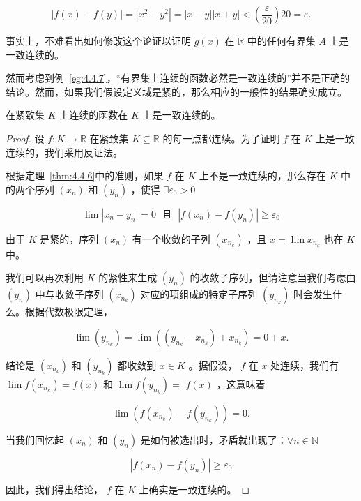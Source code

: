 \[
\left| {f\left( x\right)  - f\left( y\right) }\right|  = \left| {{x}^{2} - {y}^{2}}\right|  = \left| {x - y}\right| \left| {x + y}\right|  < \left( \frac{\varepsilon }{20}\right) {20} = \varepsilon .
\]

事实上，不难看出如何修改这个论证以证明 \(g\left( x\right)\) 在 \(\mathbb{R}\) 中的任何有界集 \(A\) 上是一致连续的。

然而考虑到例~\ref{eg:4.4.7}，“有界集上连续的函数必然是一致连续的”并不是正确的结论。然而，如果我们假设定义域是紧的，那么相应的一般性的结果确实成立。

\begin{Thm}
  \label{thm:4.4.8}
  在紧致集 \(K\) 上连续的函数在 \(K\) 上是一致连续的。
\end{Thm}

\begin{proof}
设 \(f : K \rightarrow  \mathbb{R}\) 在紧致集 \(K \subseteq  \mathbb{R}\) 的每一点都连续。为了证明 \(f\) 在 \(K\) 上是一致连续的，我们采用反证法。

根据定理~\ref{thm:4.4.6}中的准则，如果 \(f\) 在 \(K\) 上不是一致连续的，那么存在 \(K\) 中的两个序列 \(\left( {x}_{n}\right)\) 和 \(\left( {y}_{n}\right)\) ，使得 $\exists \varepsilon_0 > 0$

\[
\lim \left| {{x}_{n} - {y}_{n}}\right|  = 0\;\text{ 且 }\;\left| {f\left( {x}_{n}\right)  - f\left( {y}_{n}\right) }\right|  \geq  {\varepsilon }_{0}
\]

由于 \(K\) 是紧的，序列 \(\left( {x}_{n}\right)\) 有一个收敛的子列 \(\left( {x}_{{n}_{k}}\right)\) ，且 \(x = \lim {x}_{{n}_{k}}\) 也在 \(K\) 中。

我们可以再次利用 \(K\) 的紧性来生成 \(\left( {y}_{n}\right)\) 的收敛子序列，但请注意当我们考虑由 \(\left( {y}_{n}\right)\) 中与收敛子序列 \(\left( {x}_{{n}_{k}}\right)\) 对应的项组成的特定子序列 \(\left( {y}_{{n}_{k}}\right)\) 时会发生什么。根据代数极限定理，

\[
\lim \left( {y}_{{n}_{k}}\right)  = \lim \left( {\left( {{y}_{{n}_{k}} - {x}_{{n}_{k}}}\right)  + {x}_{{n}_{k}}}\right)  = 0 + x.
\]

结论是 \(\left( {x}_{{n}_{k}}\right)\) 和 \(\left( {y}_{{n}_{k}}\right)\) 都收敛到 \(x \in  K\) 。据假设， \(f\) 在 \(x\) 处连续，我们有 \(\lim f\left( {x}_{{n}_{k}}\right)  = f\left( x\right)\) 和 \(\lim f\left( {y}_{{n}_{k}}\right)  =\)  \(f\left( x\right)\) ，这意味着

\[
\lim \left( {f\left( {x}_{{n}_{k}}\right)  - f\left( {y}_{{n}_{k}}\right) }\right)  = 0.
\]

当我们回忆起 \(\left( {x}_{n}\right)\) 和 \(\left( {y}_{n}\right)\) 是如何被选出时，矛盾就出现了：$\forall n\in \mathbb{N}$

\[
\left| {f\left( {x}_{n}\right)  - f\left( {y}_{n}\right) }\right|  \geq  {\varepsilon }_{0}
\]

因此，我们得出结论， \(f\) 在 \(K\) 上确实是一致连续的。
  
\end{proof}


